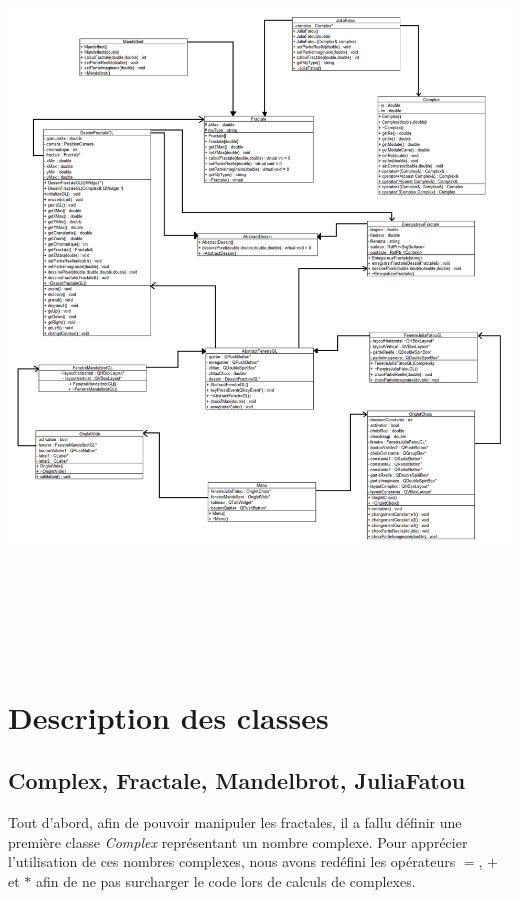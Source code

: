\documentclass[a4]{article}
\begin{document}
\hspace{-4cm}
\includegraphics[height=20cm]{UML.png}

\section{Description des classes}

\subsection{Complex, Fractale, Mandelbrot, JuliaFatou}

Tout d'abord, afin de pouvoir manipuler les fractales, il a fallu définir une première classe \emph{Complex} représentant un nombre complexe. 
Pour apprécier l'utilisation de ces nombres complexes, nous avons redéfini les opérateurs $=$, $+$ et $*$ afin de ne pas surcharger le code lors de calculs de complexes. 
\vspace{1\baselineskip} 
\end{document}
